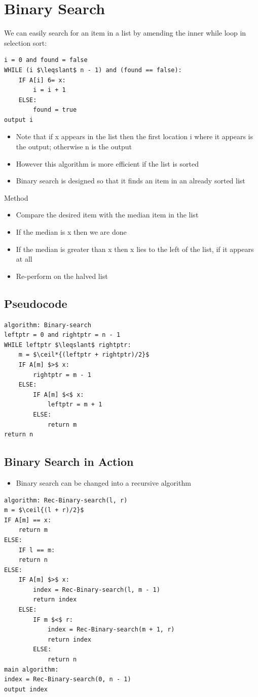 \documentclass{article}[18pt]
\DeclarePairedDelimiter{\ceil}{\lceil}{\rceil}
\begin{document}
\section{Binary Search}
We can easily search for an item in a list by amending the inner while loop in selection sort:
\begin{lstlisting}[tabsize=4,mathescape]
i = 0 and found = false
WHILE (i $\leqslant$ n - 1) and (found == false):
	IF A[i] 6= x:
		i = i + 1
	ELSE:
		found = true
output i
\end{lstlisting}
\begin{itemize}
	\item Note that if x appears in the list then the first location i where it appears is the output; otherwise n is the output
	\item However this algorithm is more efficient if the list is sorted
	\item Binary search is designed so that it finds an item in an already sorted list
\end{itemize}
Method
\begin{itemize}
	\item Compare the desired item with the median item in the list
	\item If the median is x then we are done
	\item If the median is greater than x then x lies to the left of the list, if it appears at all
	\item Re-perform on the halved list
\end{itemize}
\subsection{Pseudocode}
\begin{lstlisting}[tabsize=4,mathescape]
algorithm: Binary-search
leftptr = 0 and rightptr = n - 1
WHILE leftptr $\leqslant$ rightptr:
	m = $\ceil*{(leftptr + rightptr)/2}$
	IF A[m] $>$ x:
		rightptr = m - 1
	ELSE:
		IF A[m] $<$ x:
			leftptr = m + 1
		ELSE:
			return m
return n
\end{lstlisting}
\subsection{Binary Search in Action}
\begin{itemize}
	\item Binary search can be changed into a recursive algorithm
\end{itemize}
\begin{lstlisting}[tabsize=4,mathescape]
algorithm: Rec-Binary-search(l, r)
m = $\ceil{(l + r)/2}$
IF A[m] == x:
	return m
ELSE:
	IF l == m:
	return n
ELSE:
	IF A[m] $>$ x:
		index = Rec-Binary-search(l, m - 1)
		return index
	ELSE:
		IF m $<$ r:
			index = Rec-Binary-search(m + 1, r)
			return index
		ELSE:
			return n
main algorithm:
index = Rec-Binary-search(0, n - 1)
output index
\end{lstlisting}
\end{document}
